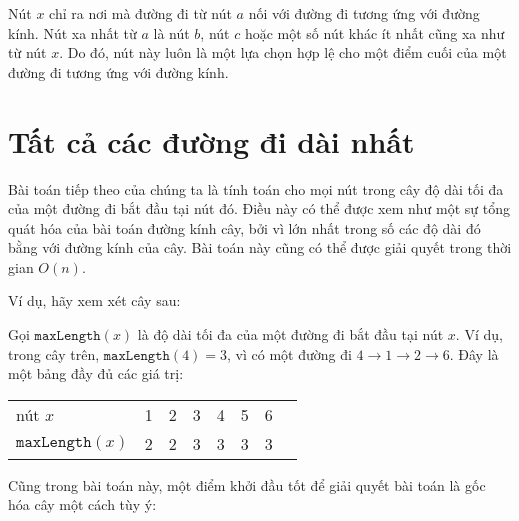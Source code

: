 Nút $x$ chỉ ra nơi mà đường đi
từ nút $a$ nối với đường đi tương ứng
với đường kính.
Nút xa nhất từ $a$
là nút $b$, nút $c$ hoặc một số nút khác
ít nhất cũng xa như từ nút $x$.
Do đó, nút này luôn là một lựa chọn hợp lệ cho
một điểm cuối của một đường đi tương ứng với đường kính.

\section{Tất cả các đường đi dài nhất}

Bài toán tiếp theo của chúng ta là tính toán cho mọi nút
trong cây độ dài tối đa của một đường đi
bắt đầu tại nút đó.
Điều này có thể được xem như một sự tổng quát hóa của
bài toán đường kính cây, bởi vì lớn nhất trong số các
độ dài đó bằng với đường kính của cây.
Bài toán này cũng có thể được giải quyết trong thời gian $O(n)$.

Ví dụ, hãy xem xét cây sau:
\begin{center}
\end{center}

Gọi $\texttt{maxLength}(x)$ là độ dài tối đa
của một đường đi bắt đầu tại nút $x$.
Ví dụ, trong cây trên,
$\texttt{maxLength}(4)=3$, vì có
một đường đi $4 \rightarrow 1 \rightarrow 2 \rightarrow 6$.
Đây là một bảng đầy đủ các giá trị:
\begin{center}
\begin{tabular}{l|lllllll}
nút $x$ & 1 & 2 & 3 & 4 & 5 & 6 \\
$\texttt{maxLength}(x)$ & 2 & 2 & 3 & 3 & 3 & 3 \\
\end{tabular}
\end{center}

Cũng trong bài toán này, một điểm khởi đầu tốt
để giải quyết bài toán là gốc hóa cây một cách tùy ý:
\begin{center}
\end{center}

